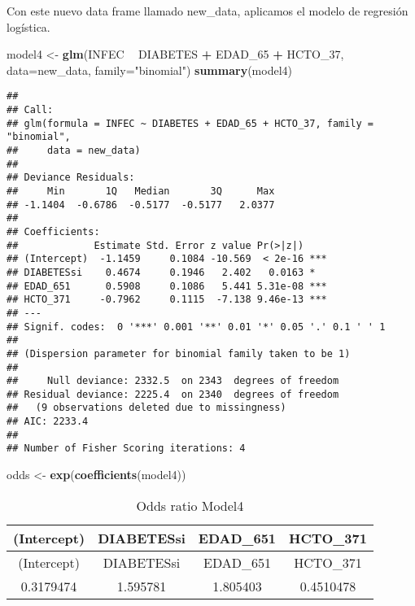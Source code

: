 \documentclass[]{article}
\newenvironment{Shaded}{\begin{snugshade}}{\end{snugshade}}
\newcommand{\DataTypeTok}[1]{\textcolor[rgb]{0.13,0.29,0.53}{#1}}
\newcommand{\DecValTok}[1]{\textcolor[rgb]{0.00,0.00,0.81}{#1}}
\newcommand{\KeywordTok}[1]{\textcolor[rgb]{0.13,0.29,0.53}{\textbf{#1}}}
\newcommand{\NormalTok}[1]{#1}
\newcommand{\OperatorTok}[1]{\textcolor[rgb]{0.81,0.36,0.00}{\textbf{#1}}}
\newcommand{\StringTok}[1]{\textcolor[rgb]{0.31,0.60,0.02}{#1}}
\begin{document}
Con este nuevo data frame llamado new\_data, aplicamos el modelo de
regresión logística.

\begin{Shaded}
\begin{Highlighting}[]
\NormalTok{model4 <-}\StringTok{ }\KeywordTok{glm}\NormalTok{(INFEC }\OperatorTok{~}\StringTok{ }\NormalTok{DIABETES }\OperatorTok{+}\StringTok{ }\NormalTok{EDAD_}\DecValTok{65} \OperatorTok{+}\StringTok{ }\NormalTok{HCTO_}\DecValTok{37}\NormalTok{, }\DataTypeTok{data=}\NormalTok{new_data, }\DataTypeTok{family=}\StringTok{"binomial"}\NormalTok{)}
\KeywordTok{summary}\NormalTok{(model4)}
\end{Highlighting}
\end{Shaded}

\begin{verbatim}
## 
## Call:
## glm(formula = INFEC ~ DIABETES + EDAD_65 + HCTO_37, family = "binomial", 
##     data = new_data)
## 
## Deviance Residuals: 
##     Min       1Q   Median       3Q      Max  
## -1.1404  -0.6786  -0.5177  -0.5177   2.0377  
## 
## Coefficients:
##             Estimate Std. Error z value Pr(>|z|)    
## (Intercept)  -1.1459     0.1084 -10.569  < 2e-16 ***
## DIABETESsi    0.4674     0.1946   2.402   0.0163 *  
## EDAD_651      0.5908     0.1086   5.441 5.31e-08 ***
## HCTO_371     -0.7962     0.1115  -7.138 9.46e-13 ***
## ---
## Signif. codes:  0 '***' 0.001 '**' 0.01 '*' 0.05 '.' 0.1 ' ' 1
## 
## (Dispersion parameter for binomial family taken to be 1)
## 
##     Null deviance: 2332.5  on 2343  degrees of freedom
## Residual deviance: 2225.4  on 2340  degrees of freedom
##   (9 observations deleted due to missingness)
## AIC: 2233.4
## 
## Number of Fisher Scoring iterations: 4
\end{verbatim}

\begin{Shaded}
\begin{Highlighting}[]
\NormalTok{odds <-}\StringTok{ }\KeywordTok{exp}\NormalTok{(}\KeywordTok{coefficients}\NormalTok{(model4))}
\end{Highlighting}
\end{Shaded}

\begin{longtable}[]{@{}cccc@{}}
\caption{Odds ratio Model4}\tabularnewline
\toprule
(Intercept) & DIABETESsi & EDAD\_651 & HCTO\_371\tabularnewline
\midrule
\endfirsthead
\toprule
(Intercept) & DIABETESsi & EDAD\_651 & HCTO\_371\tabularnewline
\midrule
\endhead
0.3179474 & 1.595781 & 1.805403 & 0.4510478\tabularnewline
\bottomrule
\end{longtable}
\end{document}
